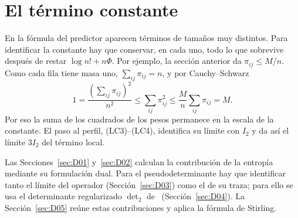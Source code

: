\section{El término constante}\label{sec:constante}

En la fórmula del predictor aparecen términos de tamaños muy distintos. Para identificar la
constante hay que conservar, en cada uno, todo lo que sobrevive después de restar $\log n!+n\Phi$.
Por ejemplo, la sección anterior da $\pi_{ij}\le M/n$. Como cada fila tiene masa uno,
$\sum_{ij}\pi_{ij}=n$, y por Cauchy--Schwarz
\[
 1=\frac{(\sum_{ij}\pi_{ij})^2}{n^2}
 \le \sum_{ij}\pi_{ij}^2
 \le \frac{M}{n}\sum_{ij}\pi_{ij}=M .
\]
Por eso la suma de los cuadrados de los pesos permanece en la escala de la constante.
El paso al perfil, (LC3)--(LC4), identifica su límite con $I_2$ y da así el límite $3I_2$ del término local.

Las Secciones~\ref{sec:D01} y~\ref{sec:D02} calculan la contribución de la entropía mediante su
formulación dual. Para el pseudodeterminante hay que identificar tanto el límite del operador
(Sección~\ref{sec:D03}) como el de su traza; para ello se usa el determinante regularizado
$\det_2$ de~\cite[cap.~9]{Simon} (Sección~\ref{sec:D04}). La Sección~\ref{sec:D05} reúne estas
contribuciones y aplica la fórmula de Stirling.
